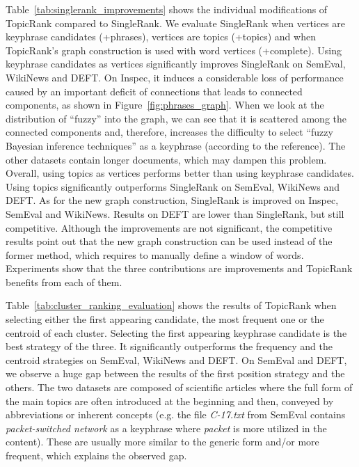   Table~\ref{tab:singlerank_improvements} shows the individual modifications of
  TopicRank compared to SingleRank. We evaluate SingleRank when vertices are
  keyphrase candidates (+phrases), vertices are topics (+topics) and when
  TopicRank's graph construction is used with word vertices (+complete). Using
  keyphrase candidates as vertices significantly improves SingleRank on SemEval,
  WikiNews and DEFT. On Inspec, it induces a considerable loss of performance
  caused by an important deficit of connections that leads to connected
  components, as shown in Figure~\ref{fig:phrases_graph}. When we look at the
  distribution of ``fuzzy'' into the graph, we can see that it is scattered
  among the connected components and, therefore, increases the difficulty to
  select ``fuzzy Bayesian inference techniques'' as a keyphrase (according to
  the reference). The other datasets contain longer documents, which may dampen
  this problem. Overall, using topics as vertices performs better than using
  keyphrase candidates. Using topics significantly outperforms SingleRank on
  SemEval, WikiNews and DEFT. As for the new graph construction, SingleRank is
  improved on Inspec, SemEval and WikiNews. Results on DEFT are lower than
  SingleRank, but still competitive. Although the improvements are not
  significant, the competitive results point out that the new graph construction
  can be used instead of the former method, which requires to manually define a
  window of words. Experiments show that the three contributions are
  improvements and TopicRank benefits from each of them.

  Table~\ref{tab:cluster_ranking_evaluation} shows the results of TopicRank when
  selecting either the first appearing candidate, the most frequent one or the
  centroid of each cluster. Selecting the first appearing keyphrase candidate is
  the best strategy of the three. It significantly outperforms the frequency and
  the centroid strategies on SemEval, WikiNews and DEFT. On SemEval and DEFT, we
  observe a huge gap between the results of the first position strategy and the
  others. The two datasets are composed of scientific articles where the full
  form of the main topics are often introduced at the beginning and then,
  conveyed by abbreviations or inherent concepts (e.g. the file
  \textit{C-17.txt} from SemEval contains \textit{packet-switched network} as a
  keyphrase where \textit{packet} is more utilized in the content). These are
  usually more similar to the generic form and/or more frequent, which explains
  the observed gap.

